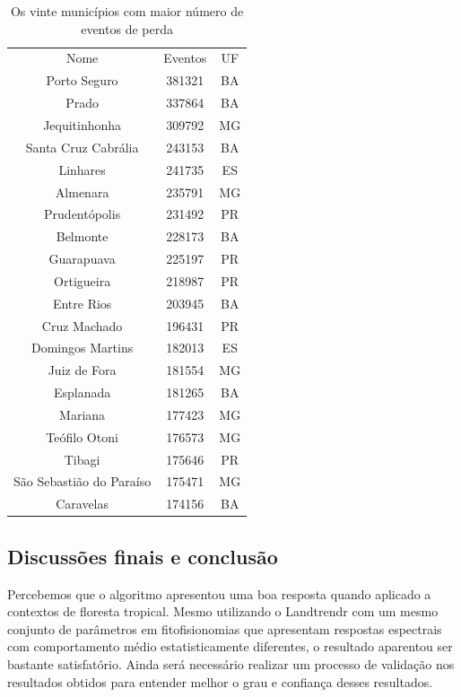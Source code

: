 \begin{table}[H]
    \centering
    \begin{tabular}{|c | c | c|}
    \hline
                            Nome & Eventos & UF \\
                Porto Seguro & 381321 & BA \\ 
                       Prado & 337864 & BA \\
                Jequitinhonha & 309792 & MG \\
        Santa Cruz Cabrália & 243153 & BA \\
                    Linhares & 241735 & ES \\
                      Almenara & 235791 & MG \\
              Prudentópolis & 231492 & PR \\
                    Belmonte & 228173 & BA \\
                  Guarapuava & 225197 & PR \\
                  Ortigueira & 218987 & PR \\
                  Entre Rios & 203945 & BA \\
                   Cruz Machado & 196431 & PR \\
            Domingos Martins & 182013 & ES \\
                 Juiz de Fora & 181554 & MG \\
                   Esplanada & 181265 & BA \\
                      Mariana & 177423 & MG \\
               Teófilo Otoni & 176573 & MG \\
                      Tibagi & 175646 & PR \\
  São Sebastião do Paraíso & 175471 & MG \\
                   Caravelas & 174156 & BA \\
    \hline
    \end{tabular}
    \caption{Os vinte municípios com maior número de eventos de perda}
    \label{tab:mun_gain}
\end{table}




\subsection{Discussões finais e conclusão}

\hspace{13pt} Percebemos que o algoritmo apresentou uma boa resposta quando aplicado a contextos de floresta tropical. Mesmo utilizando o Landtrendr com um mesmo conjunto de parâmetros em fitofisionomias que apresentam respostas espectrais com comportamento médio estatisticamente diferentes, o resultado aparentou ser bastante satisfatório. Ainda será necessário realizar um processo de validação nos resultados obtidos para entender melhor o grau e confiança desses resultados.

